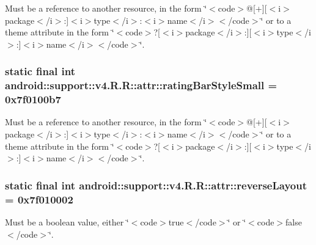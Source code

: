 Must be a reference to another resource, in the form \char`\"{}$<$code$>$@\mbox{[}+\mbox{]}\mbox{[}$<$i$>$package$<$/i$>$:\mbox{]}$<$i$>$type$<$/i$>$:$<$i$>$name$<$/i$>$$<$/code$>$\char`\"{} or to a theme attribute in the form \char`\"{}$<$code$>$?\mbox{[}$<$i$>$package$<$/i$>$:\mbox{]}\mbox{[}$<$i$>$type$<$/i$>$:\mbox{]}$<$i$>$name$<$/i$>$$<$/code$>$\char`\"{}. \hypertarget{classandroid_1_1support_1_1v4_1_1_r_1_1attr_e8ffd14ba70846a05497362dcca4084e}{
\subsubsection[{ratingBarStyleSmall}]{\setlength{\rightskip}{0pt plus 5cm}static final int android::support::v4.R.R::attr::ratingBarStyleSmall = 0x7f0100b7}}
\label{classandroid_1_1support_1_1v4_1_1_r_1_1attr_e8ffd14ba70846a05497362dcca4084e}


Must be a reference to another resource, in the form \char`\"{}$<$code$>$@\mbox{[}+\mbox{]}\mbox{[}$<$i$>$package$<$/i$>$:\mbox{]}$<$i$>$type$<$/i$>$:$<$i$>$name$<$/i$>$$<$/code$>$\char`\"{} or to a theme attribute in the form \char`\"{}$<$code$>$?\mbox{[}$<$i$>$package$<$/i$>$:\mbox{]}\mbox{[}$<$i$>$type$<$/i$>$:\mbox{]}$<$i$>$name$<$/i$>$$<$/code$>$\char`\"{}. \hypertarget{classandroid_1_1support_1_1v4_1_1_r_1_1attr_c43127a3f9ec7199e97e07462835c6e3}{
\subsubsection[{reverseLayout}]{\setlength{\rightskip}{0pt plus 5cm}static final int android::support::v4.R.R::attr::reverseLayout = 0x7f010002}}
\label{classandroid_1_1support_1_1v4_1_1_r_1_1attr_c43127a3f9ec7199e97e07462835c6e3}


Must be a boolean value, either \char`\"{}$<$code$>$true$<$/code$>$\char`\"{} or \char`\"{}$<$code$>$false$<$/code$>$\char`\"{}. 

